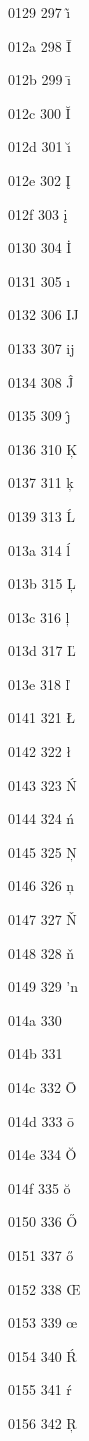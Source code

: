 \documentclass[11pt]{article}
\begin{document}
0129 297 \~{\i}

012a 298 \=I

012b 299 \={\i}

012c 300 \u{I}

012d 301 \u{\i}

012e 302 \k{I}

012f 303 \k{i}

0130 304 \.I

0131 305 \i

0132 306 IJ

0133 307 ij

0134 308 \^J

0135 309 \^{\j}

0136 310 \c{K}

0137 311 \c{k}


0139 313 \'L

013a 314 \'l

013b 315 \c{L}

013c 316 \c{l}

013d 317 \v{L}

013e 318 \v{l}



0141 321 \L

0142 322 \l

0143 323 \'N

0144 324 \'n

0145 325 \c{N}

0146 326 \c{n}

0147 327 \v{N}

0148 328 \v{n}

0149 329 'n

014a 330 \NG

014b 331 \ng

014c 332 \=O

014d 333 \=o

014e 334 \u{O}

014f 335 \u{o}

0150 336 \H{O}

0151 337 \H{o}

0152 338 \OE

0153 339 \oe

0154 340 \'R

0155 341 \'r

0156 342 \c{R}
\end{document}
